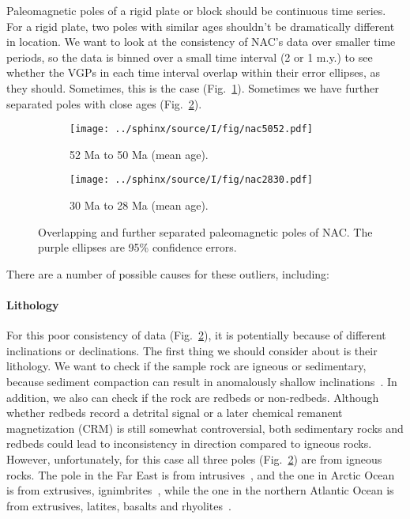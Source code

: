Paleomagnetic poles of a rigid plate or block should be continuous time series.
For a rigid plate, two poles with similar ages shouldn't be dramatically
different in location. We want to look at the consistency of NAC's data over
smaller time periods, so the data is binned over a small time interval (2 or 1
m.y.) to see whether the VGPs in each time interval overlap within their error
ellipses, as they should. Sometimes, this is the case
(Fig.~\ref{Fig:chap_intro_nac5052agemean}). Sometimes we have further separated
poles with close ages (Fig.~\ref{Fig:chap_intro_nac2830agemean}).

\begin{figure*}[tbp]
  \captionsetup[subfigure]{labelformat=empty,aboveskip=-6pt,belowskip=-6pt}
  \centering
  \begin{subfigure}[htbp]{.49\textwidth}
    \captionsetup{skip=0pt}  %
    \centering
    \texttt{[image: ../sphinx/source/I/fig/nac5052.pdf]}
    \caption{52 Ma to 50 Ma (mean age).}\label{Fig:chap_intro_nac5052agemean}
  \end{subfigure}
  \begin{subfigure}[htbp]{.49\textwidth}
    \captionsetup{skip=0pt}
    \centering
    \texttt{[image: ../sphinx/source/I/fig/nac2830.pdf]}
    \caption{30 Ma to 28 Ma (mean age).}\label{Fig:chap_intro_nac2830agemean}
  \end{subfigure}
  \caption[Example of AMP Moving Averaging Effects]{Overlapping and further
  separated paleomagnetic poles of NAC\@. The purple
  ellipses are 95\% confidence errors.}\label{Fig:chap_intro_ma-amp}
\end{figure*}

There are a number of possible causes for these outliers, including:

\paragraph{Lithology}

For this poor consistency of data (Fig.~\ref{Fig:chap_intro_nac2830agemean}), it
is potentially because of different inclinations or declinations. The first
thing we should consider about is their lithology. We want to check if the
sample rock are igneous or sedimentary, because sediment compaction can result
in anomalously shallow inclinations~\cite{T19}. In addition, we also
can check if the rock are redbeds or non-redbeds. Although whether redbeds
record a detrital signal or a later chemical remanent magnetization (CRM) is
still somewhat controversial, both sedimentary rocks and redbeds could lead to
inconsistency in direction compared to igneous rocks. However, unfortunately,
for this case all three poles (Fig.~\ref{Fig:chap_intro_nac2830agemean}) are from
igneous rocks. The pole in the Far East is from intrusives~\cite{G92},
and the one in Arctic Ocean is from extrusives, ignimbrites~\cite{M92},
while the one in the northern Atlantic Ocean is from extrusives, latites,
basalts and rhyolites~\cite{S92}.

